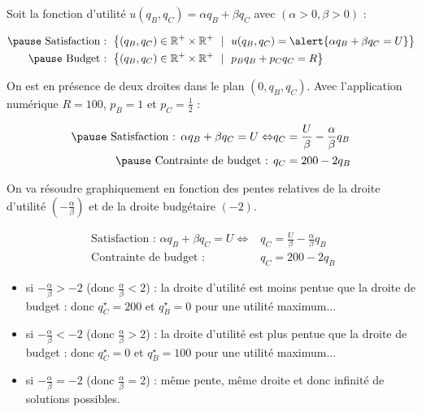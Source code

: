 \documentclass[9pt,professionalfonts,handout,hyperref]{beamer}
\begin{document}
\begin{frame}
	
	Soit la fonction d'utilité $u(q_B, q_C) = \alpha q_B + \beta q_C$ avec $(\alpha>0, \beta>0)$ :
	
	\[\begin{aligned}
\pause 	\text{ Satisfaction :   }&\left\{(q_B, q_C) \in \mathbb{R}^{+}\times\mathbb{R}^{+} ~~|~~u(q_B, q_C) = \alert{\alpha q_B + \beta q_C = U} \right\} \\
\pause 	\text{ Budget :   }&\left\{(q_B, q_C) \in \mathbb{R}^{+}\times\mathbb{R}^{+} ~~|~~p_Bq_B + p_Cq_C=R\right\}
	\end{aligned}\]
	
	\bigskip 
	
\pause 	On est en présence de deux droites dans le plan $(0,q_B,q_C)$. Avec l'application numérique $R =100$, $p_B= 1$ et $p_C = \frac{1}{2}$ :
	
	\[\begin{aligned}
\pause 	\text{ Satisfaction :   }\alpha q_B + \beta q_C = U \Leftrightarrow &q_C = \frac{U}{\beta}-\frac{\alpha}{\beta}q_B \\
\pause 	\text{ Contrainte de budget : }&q_C = 200-2q_B
	\end{aligned}\]
	
\bigskip 

\pause On va résoudre graphiquement en fonction des pentes relatives de la droite d'utilité $(-\frac{\alpha}{\beta})$ et de la droite budgétaire $(-2)$. 

\end{frame}

\begin{frame}

\[\begin{aligned}
\text{ Satisfaction :   }\alpha q_B + \beta q_C = U \Leftrightarrow &q_C = \frac{U}{\beta}-\frac{\alpha}{\beta}q_B \\
\text{ Contrainte de budget :   }&q_C = 200-2q_B
\end{aligned}\]

\bigskip 

\begin{itemize}
\pause 	\item si $-\frac{\alpha}{\beta}>-2$ (donc $\frac{\alpha}{\beta}<2$) : \pause la droite d'utilité est moins pentue que la droite de budget \pause : donc $q_C^\star=200$ et $q_B^\star=0$ pour une utilité maximum...\newline 

\pause 	\item si $-\frac{\alpha}{\beta}<-2$ (donc $\frac{\alpha}{\beta}>2$) : \pause la droite d'utilité est plus pentue que la droite de budget \pause : donc $q_C^\star=0$ et $q_B^\star=100$ pour une utilité maximum...\newline 

\pause 	\item si $-\frac{\alpha}{\beta}=-2$ (donc $\frac{\alpha}{\beta}=2$) : \pause même pente, même droite et donc infinité de solutions possibles. 
\end{itemize}
	
\end{frame}
\end{document}
